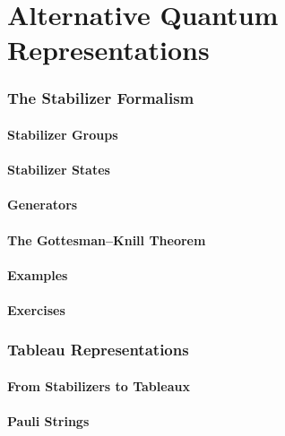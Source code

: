 \documentclass[11pt,a4paper]{article}
\begin{document}
\part{Alternative Quantum Representations}

\section{The Stabilizer Formalism}

\subsection{Stabilizer Groups}

\subsection{Stabilizer States}

\subsection{Generators}

\subsection{The Gottesman--Knill Theorem}

\subsection{Examples}

\subsection{Exercises}


\section{Tableau Representations}

\subsection{From Stabilizers to Tableaux}

\subsection{Pauli Strings}
\end{document}

